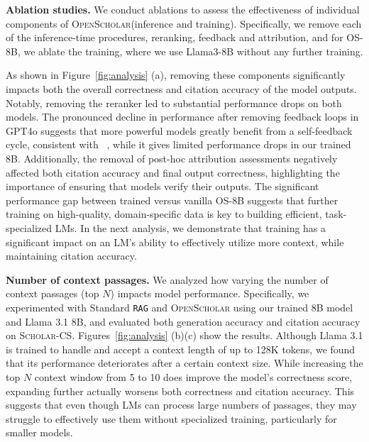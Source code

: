 \documentclass{article} %
\newcommand{\model}{\textsc{OpenScholar}\xspace}
\renewcommand{\paragraph}[1]{\noindent \textbf{#1}}
\begin{document}
\paragraph{Ablation studies.}
We conduct ablations to assess the effectiveness of individual components of \model (inference and training). Specifically, we remove each of the inference-time procedures, reranking, feedback and attribution, and for OS-8B, we ablate the training, where we use Llama3-8B without any further training.  

As shown in Figure~\ref{fig:analysis} (a), removing these components significantly impacts both the overall correctness and citation accuracy of the model outputs. Notably, removing the reranker led to substantial performance drops on both models. 
The pronounced decline in performance after removing feedback loops in  GPT4o suggests that more powerful models greatly benefit from a self-feedback cycle, consistent with ~\citet{madaan2023self}, while it gives limited performance drops in our trained 8B.  Additionally, the removal of post-hoc attribution assessments negatively affected both citation accuracy and final output correctness, highlighting the importance of ensuring that models verify their outputs. 
The significant performance gap between trained versus vanilla OS-8B suggests that further training on high-quality, domain-specific data is key to building efficient, task-specialized LMs. 
In the next analysis, we demonstrate that training has a significant impact on an LM's ability to effectively utilize more context, while maintaining citation accuracy. 

\paragraph{Number of context passages.}
We analyzed how varying the number of context passages  (top $N$) impacts model performance. 
Specifically, we experimented with Standard \texttt{RAG} and \model using our trained 8B model and Llama 3.1 8B, and evaluated both generation accuracy and citation accuracy on \textsc{Scholar-CS}. 
Figures~\ref{fig:analysis} (b)(c) show the results.
Although Llama 3.1 is trained to handle and accept a context length of up to 128K tokens, we found that its performance deteriorates after a certain context size. While increasing the top $N$ context window from 5 to 10 does improve the model’s correctness score, expanding further actually worsens both correctness and citation accuracy. This suggests that even though LMs can process large numbers of passages, they may struggle to effectively use them without specialized training, particularly for smaller models. 
\end{document}
